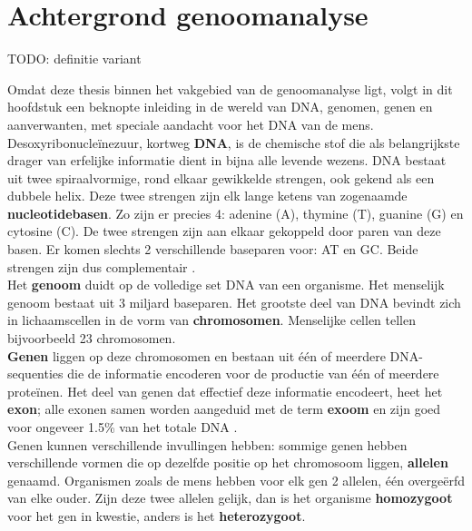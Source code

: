 \chapter{Achtergrond genoomanalyse}
\label{dna_dummies}

{\color{red} TODO: definitie variant}

Omdat deze thesis binnen het vakgebied van de genoomanalyse ligt, volgt in dit hoofdstuk een beknopte inleiding in de wereld van DNA, genomen, genen en aanverwanten, met speciale aandacht voor het DNA van de mens.\\

Desoxyribonucle\"inezuur, kortweg \textbf{DNA}, is de chemische stof die als belangrijkste drager van erfelijke informatie dient in bijna alle levende wezens. DNA bestaat uit twee spiraalvormige, rond elkaar gewikkelde strengen, ook gekend als een dubbele helix. Deze twee strengen zijn elk lange ketens van zogenaamde \textbf{nucleotidebasen}. Zo zijn er precies 4: adenine (A), thymine (T), guanine (G) en cytosine (C). De twee strengen zijn aan elkaar gekoppeld door paren van deze basen. Er komen slechts 2 verschillende baseparen voor: AT en GC. Beide strengen zijn dus complementair \cite{genome_gov} \cite{nature_scitable}.\\

Het \textbf{genoom} duidt op de volledige set DNA van een organisme. Het menselijk genoom bestaat uit 3 miljard baseparen. Het grootste deel van DNA bevindt zich in lichaamscellen in de vorm van \textbf{chromosomen}. Menselijke cellen tellen bijvoorbeeld 23 chromosomen.\\
\textbf{Genen} liggen op deze chromosomen en bestaan uit \'e\'en of meerdere DNA-sequenties die de informatie encoderen voor de productie van \'e\'en of meerdere prote\"inen. Het deel van genen dat effectief deze informatie encodeert, heet het \textbf{exon}; alle exonen samen worden aangeduid met de term \textbf{exoom} en zijn goed voor ongeveer 1.5\% van het totale DNA \cite{broad_exome}.\\
Genen kunnen verschillende invullingen hebben: sommige genen hebben verschillende vormen die op dezelfde positie op het chromosoom liggen, \textbf{allelen} genaamd. Organismen zoals de mens hebben voor elk gen 2 allelen, \'e\'en overge\"erfd van elke ouder. Zijn deze twee allelen gelijk, dan is het organisme \textbf{homozygoot} voor het gen in kwestie, anders is het \textbf{heterozygoot}.

